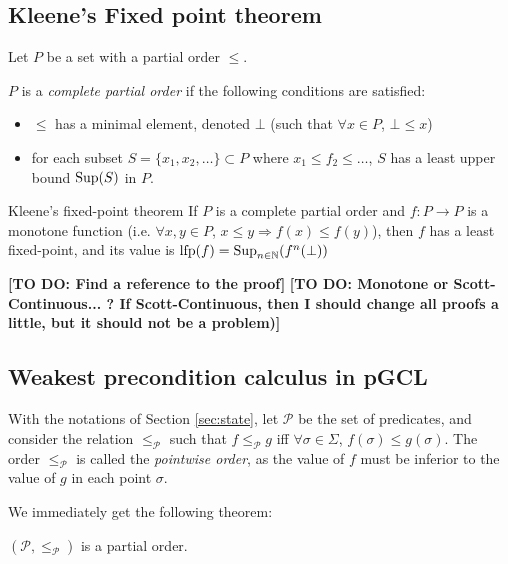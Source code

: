 \documentclass[a4paper,10pt]{llncs}
\def\NN {{\mathbb N}}
\def\Sup {\textnormal {Sup}}
\newcommand\todo[1]{{\color{red}\textbf{[TO DO:  #1]}}}
\begin{document}
\subsection{Kleene's Fixed point theorem}
\label{subsec:kleene}

Let $P$ be a set with a partial order $\leq$.
\begin{definition}
$P$ is a \emph{complete partial order} if the following conditions are satisfied:
\begin{itemize}
\item $\leq$ has a minimal element, denoted $\bot$ (such that $\forall x \in P$, $\bot \leq x$)
\item for each subset $S = \{x_1, x_2, \dots \} \subset P$ where $x_1 \leq f_2 \leq \dots $, $S$ has a least upper bound $\Sup(S)$ in $P$.
\end{itemize}
\end{definition}

\begin{theorem}{\textnormal{Kleene's fixed-point theorem}}
If $P$ is a complete partial order and $f : P \rightarrow P$ is a monotone function (i.e. $\forall x,y \in P$, $x \leq y \Rightarrow f(x) \leq f(y)$), then $f$ has a least fixed-point, and its value is $\textnormal{lfp}(f) = \Sup_{n \in \NN}(f^n(\bot))$
\end{theorem} \todo{Find a reference to the proof}
\todo{Monotone or Scott-Continuous... ? If Scott-Continuous, then I should change all proofs a little, but it should not be a problem)}
\subsection{Weakest precondition calculus in pGCL}
\label{subsec:predicates_cpo}

With the notations of Section \ref{sec:state}, let $\mathcal{P}$ be the set of predicates, and consider the relation $\leq_{\mathcal{P}}$ such that $f \leq_{\mathcal{P}} g$ iff $\forall \sigma \in \Sigma$, $f(\sigma) \leq g(\sigma)$. The order $\leq_{\mathcal{P}}$ is called the \emph{pointwise order}, as the value of $f$ must be inferior to the value of $g$ in each point $\sigma$.\bigskip

We immediately get the following theorem:
\begin{theorem}
$(\mathcal{P},\leq_{\mathcal{P}})$ is a partial order.
\end{theorem}
\end{document}
